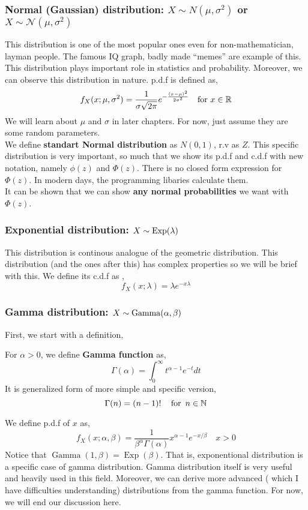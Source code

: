 \subsubsection*{Normal (Gaussian) distribution: $X \sim N(\mu, \sigma^2)$ or $X \sim \mathcal{N}(\mu, \sigma^2)$}
This distribution is one of the most popular ones even for non-mathematician, layman people. The famous IQ graph, badly made ``memes'' are example of this. This distribution plays important role in statistics and probability. Moreover, we can observe this distribution in nature. p.d.f is defined as,
\[f_X(x; \mu, \sigma^2) = \frac{1}{\sigma \sqrt{2 \pi}}  e^{- \frac{(x- \mu)^2}{2\sigma^2}} \quad \text{for} \ x \in {\mathbb{R}} \]
We will learn about $\mu$ and $\sigma$ in later chapters. For now, just assume they are some random parameters. \\
We define  \textbf{standart Normal distribution} as $N(0,1)$, r.v as $Z$. This specific distribution is very important, so much that we show its p.d.f and c.d.f with new notation, namely $\phi(z)$ and $\Phi(z)$. There is no closed form expression for $\Phi(z)$. In modern days, the programming libaries calculate them. \\
It can be shown that we can show \textbf{any normal  probabilities} we want with $\Phi(z)$.
\subsubsection*{Exponential distribution: $X \sim \operatorname{Exp}(\lambda)$}
This distribution is continous analogue of the geometric distribution. This distribution (and the ones after this) has complex properties so we will be brief with this.
We define its c.d.f as ,
\[f_X(x; \lambda) = \lambda e^{-x \lambda}\]
\subsubsection*{Gamma distribution: $X \sim \operatorname{Gamma} (\alpha, \beta)$}
First, we start with a definition,
\begin{definition}
    For $\alpha > 0$, we define \textbf{Gamma function} as,
    \[\Gamma(\alpha) = \int_{0}^{\infty} t^{\alpha-1} e^{-t}dt\]
    It is generalized form of more simple and specific version, 
    \[ \Gamma(n) = (n-1)! \quad \operatorname{for} \ n \in \mathbb{N} \]
\end{definition}
    We define p.d.f of $x$ as,
    \[f_X(x; \alpha, \beta) =  \frac{1}{\beta^{\alpha} \Gamma(\alpha)} x^{\alpha-1} e^{-x/ \beta} \quad x > 0\]
    Notice that $ \operatorname{Gamma}(1, \beta) =\operatorname{Exp}( \beta)$. That is, exponentional distribution is a specific case of gamma distribution.
    Gamma distribution itself is very useful and heavily used in this field. Moreover, we can derive more advanced ( which I have difficulties understanding) distributions from the gamma function. For now, we will end our discussion here.

